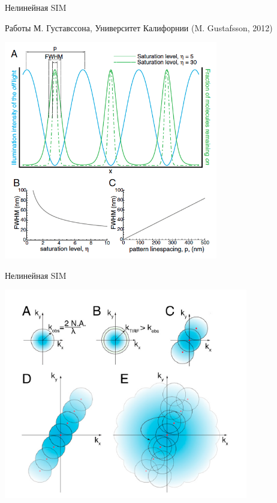 \documentclass[9pt, compress, xcolor=table]{beamer}
\begin{document}
\begin{frame}{Нелинейная SIM}
\begin{center}

Работы М. Густавссона, Университет Калифорнии (M. Gustafsson, 2012)

\includegraphics[width=0.7\textwidth]{nlsim7}
\end{center}
\end{frame}

\begin{frame}{Нелинейная SIM}
\begin{center}
\includegraphics[width=0.8\textwidth]{nlsim8}
\end{center}
\end{frame}
\end{document}

